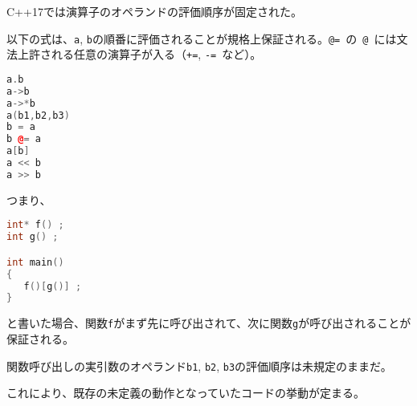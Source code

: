 %

C++17では演算子のオペランドの評価順序が固定された。

以下の式は、\lstinline!a!, \lstinline!b!の順番に評価されることが規格上保証される。\lstinline!@=!~の~\lstinline!@!~には文法上許される任意の演算子が入る（\lstinline!+=!, \lstinline!-=!~など）。

\begin{lstlisting}[language=C++]
a.b
a->b
a->*b
a(b1,b2,b3)
b = a
b @= a
a[b]
a << b
a >> b
\end{lstlisting}

つまり、
\begin{lstlisting}[language=C++]
int* f() ;
int g() ;

int main()
{
   f()[g()] ; 
}
\end{lstlisting}
と書いた場合、関数\lstinline!f!がまず先に呼び出されて、次に関数\lstinline!g!が呼び出されることが保証される。

関数呼び出しの実引数のオペランド\lstinline!b1!, \lstinline!b2!,
\lstinline!b3!の評価順序は未規定のままだ。

これにより、既存の未定義の動作となっていたコードの挙動が定まる。

